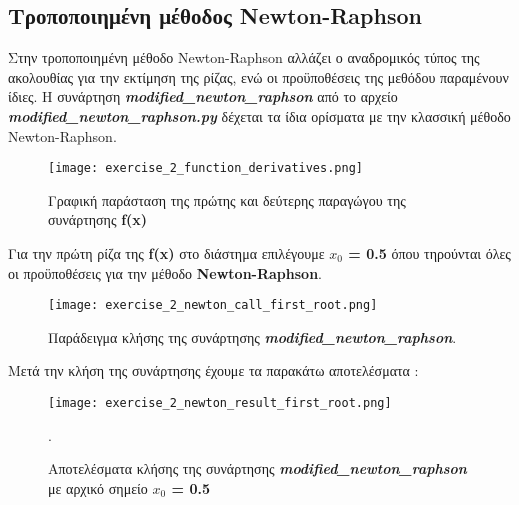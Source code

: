\documentclass[First Project.tex]{subfiles}
\begin{document}
\subsection{ Τροποποιημένη μέθοδος \textlatin{Newton-Raphson} }

Στην τροποποιημένη μέθοδο \textlatin{Newton-Raphson} αλλάζει ο αναδρομικός τύπος της ακολουθίας για την εκτίμηση της ρίζας, ενώ οι 
προϋποθέσεις της μεθόδου παραμένουν ίδιες. Η συνάρτηση \textit{\textlatin{\textbf{modified\_newton\_raphson}}} από το αρχείο 
\textit{\textlatin{\textbf{modified\_newton\_raphson.py}}} δέχεται τα ίδια ορίσματα με την κλασσική μέθοδο \textlatin{Newton-Raphson}.
\begin{figure}[h!]
    \centering
    \captionsetup{justification=centering}
    \begin{center}
        \texttt{[image: exercise\_2\_function\_derivatives.png]}    
        \caption{Γραφική παράσταση της πρώτης και δεύτερης παραγώγου της συνάρτησης \textlatin{\textbf{f(x)}}}
    \end{center}
\end{figure}

Για την πρώτη ρίζα της \textlatin{\textbf{f(x)}} στο διάστημα επιλέγουμε \textlatin{\textbf{ $x_{0}$ = 0.5}} όπου τηρούνται όλες οι προϋποθέσεις
για την μέθοδο \textlatin{\textbf{Newton-Raphson}}. 
\begin{figure}[h!]
    \centering
    \captionsetup{justification=centering}
    \begin{center}
        \texttt{[image: exercise\_2\_newton\_call\_first\_root.png]}    
        \caption{Παράδειγμα κλήσης της συνάρτησης \textit{\textlatin{\textbf{modified\_newton\_raphson}}}.}
    \end{center}
\end{figure}
Μετά την κλήση της συνάρτησης έχουμε τα παρακάτω αποτελέσματα :
\begin{figure}[h!]
    \centering
    \captionsetup{justification=centering}
    \begin{center}
    \texttt{[image: exercise\_2\_newton\_result\_first\_root.png]}    
    \caption{ Αποτελέσματα κλήσης της συνάρτησης \textit{\textlatin{\textbf{modified\_newton\_raphson}}} \\ με αρχικό σημείο 
                \textlatin{\textbf{$x_{0}$ = 0.5}}}.
    \end{center}
\end{figure}
\end{document}
